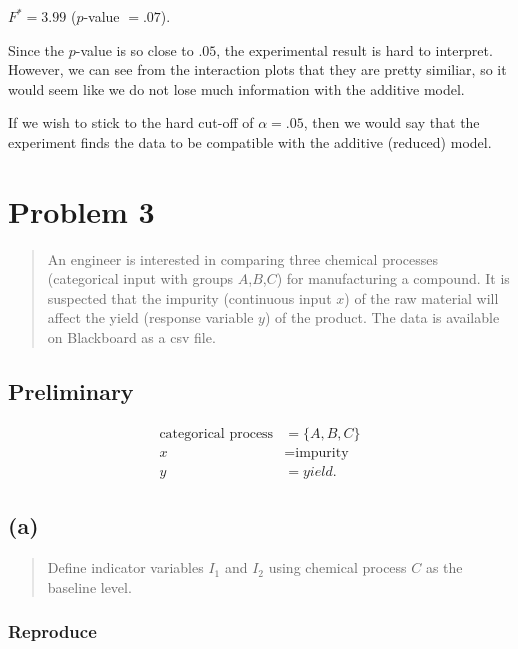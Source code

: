 \documentclass[
]{article}
\begin{document}
\(F^* = 3.99\) (\(p\)-value \(= .07\)).

Since the \(p\)-value is so close to \(.05\), the experimental result is
hard to interpret. However, we can see from the interaction plots that
they are pretty similiar, so it would seem like we do not lose much
information with the additive model.

If we wish to stick to the hard cut-off of \(\alpha = .05\), then we
would say that the experiment finds the data to be compatible with the
additive (reduced) model.

\hypertarget{problem-3}{%
\section{Problem 3}\label{problem-3}}

\begin{quote}
An engineer is interested in comparing three chemical processes
(categorical input with groups \(A\),\(B\),\(C\)) for manufacturing a
compound. It is suspected that the impurity (continuous input \(x\)) of
the raw material will affect the yield (response variable \(y\)) of the
product. The data is available on Blackboard as a csv file.
\end{quote}

\hypertarget{preliminary}{%
\subsection{Preliminary}\label{preliminary}}

\begin{align*}
  \text{categorical process} &= \{A,B,C\}\\
  x &= \text{impurity}\\
  y &= yield.
\end{align*}

\hypertarget{a-2}{%
\subsection{(a)}\label{a-2}}

\begin{quote}
Define indicator variables \(I_1\) and \(I_2\) using chemical process
\(C\) as the baseline level.
\end{quote}

\hypertarget{reproduce-12}{%
\subsubsection{Reproduce}\label{reproduce-12}}
\end{document}
